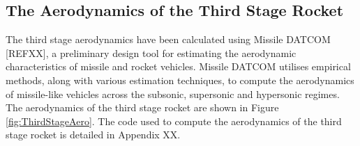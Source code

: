 		
		

		\subsection{The Aerodynamics of the Third Stage Rocket}
		
		The third stage aerodynamics have been calculated using Missile DATCOM [REFXX], a preliminary design tool for estimating the aerodynamic characteristics of missile and rocket vehicles. Missile DATCOM utilises empirical methods, along with various estimation techniques, to compute the aerodynamics of missile-like vehicles across the subsonic, supersonic and hypersonic regimes. The aerodynamics of the third stage rocket are shown in Figure \ref{fig:ThirdStageAero}. The code used to compute the aerodynamics of the third stage rocket is detailed in Appendix XX.  
		
